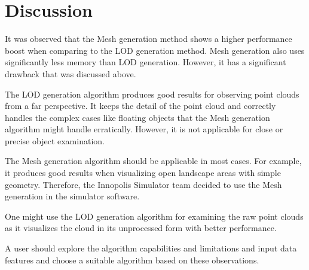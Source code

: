 \section{Discussion}

It was observed that the Mesh generation method shows a higher performance boost when comparing to the LOD generation method. Mesh generation also uses significantly less memory than LOD generation. However, it has a significant drawback that was discussed above.

The LOD generation algorithm produces good results for observing point clouds from a far perspective. It keeps the detail of the point cloud and correctly handles the complex cases like floating objects that the Mesh generation algorithm might handle erratically. However, it is not applicable for close or precise object examination.

The Mesh generation algorithm should be applicable in most cases. For example, it produces good results when visualizing open landscape areas with simple geometry. Therefore, the Innopolis Simulator team decided to use the Mesh generation in the simulator software.

One might use the LOD generation algorithm for examining the raw point clouds as it visualizes the cloud in its unprocessed form with better performance.

A user should explore the algorithm capabilities and limitations and input data features and choose a suitable algorithm based on these observations.
